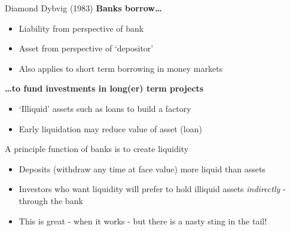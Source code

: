 \begin{frame}{Diamond Dybvig (1983)}
\textbf{Banks borrow\ldots}
		\begin{itemize}
		\item	Liability from perspective of bank
		\item	Asset from perspective of `depositor'
		\item	Also applies to short term borrowing in money markets
		\end{itemize}
\vspace{1mm}		
\textbf{\ldots to fund investments in long(er) term projects}
	\begin{itemize}
	\item	`Illiquid' assets such as loans to build a factory
	\item	Early liquidation may reduce value of asset (loan)
	\end{itemize}
\vspace{4mm}
A principle function of banks is to create liquidity
	\begin{itemize}
	\item	Deposits (withdraw any time at face value) more liquid than assets
	\item	Investors who want liquidity will prefer to hold illiquid assets \emph{indirectly} - through the bank
	\item	This is great - when it works - but there is a nasty sting in the tail!
	\end{itemize}

\end{frame}



